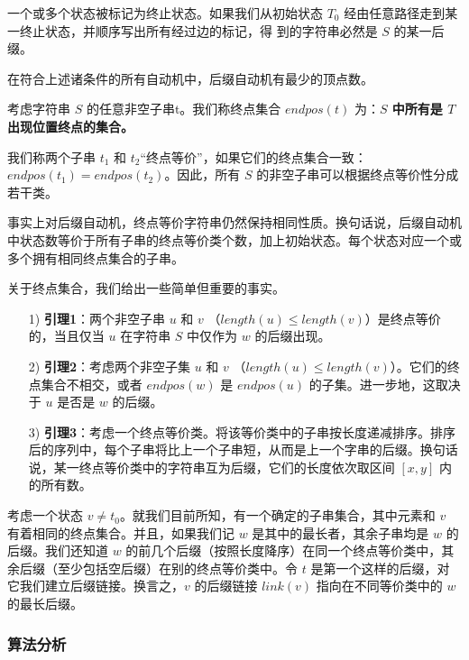 \documentclass[UTF8]{ctexart}
\begin{document}
一个或多个状态被标记为终止状态。如果我们从初始状态 $T_0$ 经由任意路径走到某一终止状态，并顺序写出所有经过边的标记，得
到的字符串必然是 $S$ 的某一后缀。 \par

在符合上述诸条件的所有自动机中，后缀自动机有最少的顶点数。 \par

考虑字符串 $S$ 的任意非空子串t。我们称终点集合 $endpos(t)$ 为：\textbf{$S$ 中所有是 $T$ 出现位置终点的集合。} \par

我们称两个子串 $t_1$ 和 $t_2$“终点等价”，如果它们的终点集合一致：$endpos(t_1)=endpos(t_2)$。因此，所有 $S$ 的非空子串可以根据终点等价性分成若干类。 \par

事实上对后缀自动机，终点等价字符串仍然保持相同性质。换句话说，后缀自动机中状态数等价于所有子串的终点等价类个数，加上初始状态。每个状态对应一个或多个拥有相同终点集合的子串。 \par

关于终点集合，我们给出一些简单但重要的事实。 \par

\begin{itemize}
  \item [1)] 
\textbf{引理1}：两个非空子串 $u$ 和 $v$ （$length(u) \leq length(v)$）是终点等价的，当且仅当 $u$ 在字符串 $S$ 中仅作为 $w$ 的后缀出现。
  \item [2)] 
\textbf{引理2}：考虑两个非空子集 $u$ 和 $v$ （$length(u) \leq length(v)$）。它们的终点集合不相交，或者 $endpos(w)$ 是 $endpos(u)$ 的子集。进一步地，这取决于 $u$ 是否是 $w$ 的后缀。
 \item [3)] 
\textbf{引理3}：考虑一个终点等价类。将该等价类中的子串按长度递减排序。排序后的序列中，每个子串将比上一个子串短，从而是上一个字串的后缀。换句话说，某一终点等价类中的字符串互为后缀，它们的长度依次取区间 $[x,y]$ 内的所有数。
\end{itemize}

考虑一个状态 $v \ne t_0$。就我们目前所知，有一个确定的子串集合，其中元素和 $v$ 有着相同的终点集合。并且，如果我们记 $w$ 是其中的最长者，其余子串均是 $w$ 的后缀。我们还知道 $w$ 的前几个后缀（按照长度降序）在同一个终点等价类中，其余后缀（至少包括空后缀）在别的终点等价类中。令 $t$ 是第一个这样的后缀，对它我们建立后缀链接。换言之，$v$ 的后缀链接 $link(v)$ 指向在不同等价类中的 $w$ 的最长后缀。

\subsubsection {算法分析}
\end{document}
